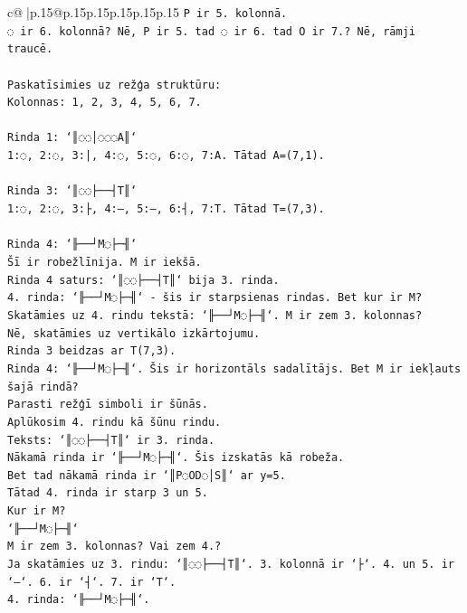 \documentclass{article}
\begin{document}
{\begin{supertabular}{c@{$\;$}|p{.15\linewidth}@{}p{.15\linewidth}p{.15\linewidth}p{.15\linewidth}p{.15\linewidth}p{.15\linewidth}}
{{{\texttt{P ir 5. kolonnā.} \\
\texttt{◌ ir 6. kolonnā? Nē, P ir 5. tad ◌ ir 6. tad O ir 7.? Nē, rāmji traucē.} \\
\\ 
\texttt{Paskatīsimies uz režģa struktūru:} \\
\texttt{Kolonnas: 1, 2, 3, 4, 5, 6, 7.} \\
\\ 
\texttt{Rinda 1: `║◌◌│◌◌◌A║`} \\
\texttt{1:◌, 2:◌, 3:|, 4:◌, 5:◌, 6:◌, 7:A. Tātad A=(7,1).} \\
\\ 
\texttt{Rinda 3: `║◌◌├──┤T║`} \\
\texttt{1:◌, 2:◌, 3:├, 4:–, 5:–, 6:┤, 7:T. Tātad T=(7,3).} \\
\\ 
\texttt{Rinda 4: `╟──┘M◌├─╢`} \\
\texttt{Šī ir robežlīnija. M ir iekšā.} \\
\texttt{Rinda 4 saturs: `║◌◌├──┤T║` bija 3. rinda.} \\
\texttt{4. rinda: `╟──┘M◌├─╢` {-} šis ir starpsienas rindas. Bet kur ir M?} \\
\texttt{Skatāmies uz 4. rindu tekstā: `╟──┘M◌├─╢`. M ir zem 3. kolonnas?} \\
\texttt{Nē, skatāmies uz vertikālo izkārtojumu.} \\
\texttt{Rinda 3 beidzas ar T(7,3).} \\
\texttt{Rinda 4: `╟──┘M◌├─╢`. Šis ir horizontāls sadalītājs. Bet M ir iekļauts šajā rindā?} \\
\texttt{Parasti režģī simboli ir šūnās.} \\
\texttt{Aplūkosim 4. rindu kā šūnu rindu.} \\
\texttt{Teksts: `║◌◌├──┤T║` ir 3. rinda.} \\
\texttt{Nākamā rinda ir `╟──┘M◌├─╢`. Šis izskatās kā robeža.} \\
\texttt{Bet tad nākamā rinda ir `║P◌OD◌│S║` ar y=5.} \\
\texttt{Tātad 4. rinda ir starp 3 un 5.} \\
\texttt{Kur ir M?} \\
\texttt{`╟──┘M◌├─╢`} \\
\texttt{M ir zem 3. kolonnas? Vai zem 4.?} \\
\texttt{Ja skatāmies uz 3. rindu: `║◌◌├──┤T║`. 3. kolonnā ir `├`. 4. un 5. ir `–`. 6. ir `┤`. 7. ir `T`.} \\
\texttt{4. rinda: `╟──┘M◌├─╢`.} \\
}}}
\end{supertabular}}
\end{document}
